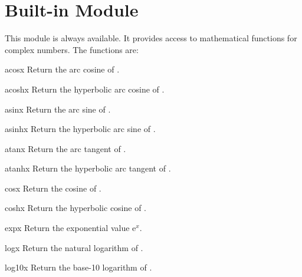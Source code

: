 \section{Built-in Module }
\label{module-cmath}

\renewcommand{\indexsubitem}{(in module cmath)}
This module is always available.
It provides access to mathematical functions for complex numbers.
The functions are:

\begin{funcdesc}{acos}{x}
Return the arc cosine of .
\end{funcdesc}

\begin{funcdesc}{acosh}{x}
Return the hyperbolic arc cosine of .
\end{funcdesc}

\begin{funcdesc}{asin}{x}
Return the arc sine of .
\end{funcdesc}

\begin{funcdesc}{asinh}{x}
Return the hyperbolic arc sine of .
\end{funcdesc}

\begin{funcdesc}{atan}{x}
Return the arc tangent of .
\end{funcdesc}

\begin{funcdesc}{atanh}{x}
Return the hyperbolic arc tangent of .
\end{funcdesc}

\begin{funcdesc}{cos}{x}
Return the cosine of .
\end{funcdesc}

\begin{funcdesc}{cosh}{x}
Return the hyperbolic cosine of .
\end{funcdesc}

\begin{funcdesc}{exp}{x}
Return the exponential value $\mbox{e}^x$.
\end{funcdesc}

\begin{funcdesc}{log}{x}
Return the natural logarithm of .
\end{funcdesc}

\begin{funcdesc}{log10}{x}
Return the base-10 logarithm of .
\end{funcdesc}

